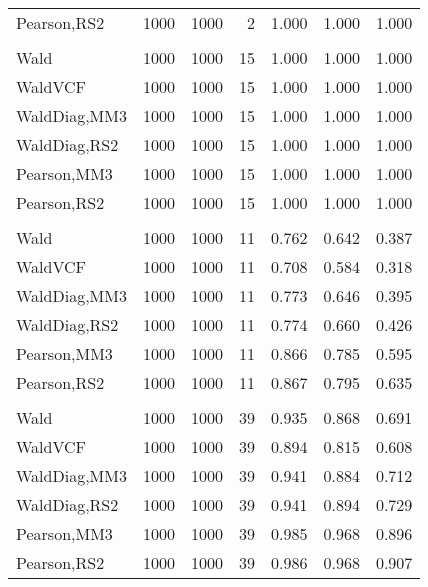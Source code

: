\documentclass[
]{article}
\begin{document}
\begin{table}[H]
{\begin{tabular}[t]{lrrrrrr}
\hspace{1em}Pearson,RS2 & 1000 & 1000 & 2 & 1.000 & 1.000 & 1.000\\
\addlinespace[0.3em]
\multicolumn{7}{l}{\textbf{1F 15V}}\\
\hspace{1em}Wald & 1000 & 1000 & 15 & 1.000 & 1.000 & 1.000\\
\hspace{1em}WaldVCF & 1000 & 1000 & 15 & 1.000 & 1.000 & 1.000\\
\hspace{1em}WaldDiag,MM3 & 1000 & 1000 & 15 & 1.000 & 1.000 & 1.000\\
\hspace{1em}WaldDiag,RS2 & 1000 & 1000 & 15 & 1.000 & 1.000 & 1.000\\
\hspace{1em}Pearson,MM3 & 1000 & 1000 & 15 & 1.000 & 1.000 & 1.000\\
\hspace{1em}Pearson,RS2 & 1000 & 1000 & 15 & 1.000 & 1.000 & 1.000\\
\addlinespace[0.3em]
\multicolumn{7}{l}{\textbf{2F 10V}}\\
\hspace{1em}Wald & 1000 & 1000 & 11 & 0.762 & 0.642 & 0.387\\
\hspace{1em}WaldVCF & 1000 & 1000 & 11 & 0.708 & 0.584 & 0.318\\
\hspace{1em}WaldDiag,MM3 & 1000 & 1000 & 11 & 0.773 & 0.646 & 0.395\\
\hspace{1em}WaldDiag,RS2 & 1000 & 1000 & 11 & 0.774 & 0.660 & 0.426\\
\hspace{1em}Pearson,MM3 & 1000 & 1000 & 11 & 0.866 & 0.785 & 0.595\\
\hspace{1em}Pearson,RS2 & 1000 & 1000 & 11 & 0.867 & 0.795 & 0.635\\
\addlinespace[0.3em]
\multicolumn{7}{l}{\textbf{3F 15V}}\\
\hspace{1em}Wald & 1000 & 1000 & 39 & 0.935 & 0.868 & 0.691\\
\hspace{1em}WaldVCF & 1000 & 1000 & 39 & 0.894 & 0.815 & 0.608\\
\hspace{1em}WaldDiag,MM3 & 1000 & 1000 & 39 & 0.941 & 0.884 & 0.712\\
\hspace{1em}WaldDiag,RS2 & 1000 & 1000 & 39 & 0.941 & 0.894 & 0.729\\
\hspace{1em}Pearson,MM3 & 1000 & 1000 & 39 & 0.985 & 0.968 & 0.896\\
\hspace{1em}Pearson,RS2 & 1000 & 1000 & 39 & 0.986 & 0.968 & 0.907\\
\bottomrule
\end{tabular}}
\endgroup{}
\end{table}
\end{document}
